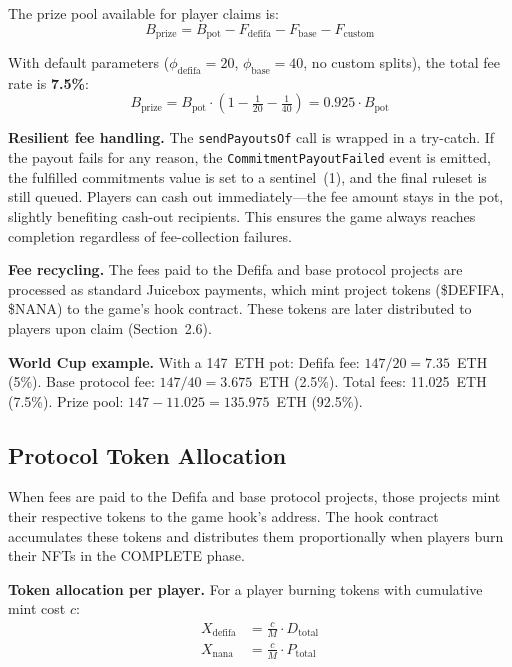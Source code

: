 \documentclass[11pt,a4paper]{article}
\begin{document}
The prize pool available for player claims is:
\begin{equation}
\boxed{B_{\text{prize}} = B_{\text{pot}} - F_{\text{defifa}} - F_{\text{base}} - F_{\text{custom}}}
\end{equation}

With default parameters ($\phi_{\text{defifa}} = 20$, $\phi_{\text{base}} = 40$, no custom splits), the total fee rate is \textbf{7.5\%}:
\begin{equation}
B_{\text{prize}} = B_{\text{pot}} \cdot \left(1 - \tfrac{1}{20} - \tfrac{1}{40}\right) = 0.925 \cdot B_{\text{pot}}
\end{equation}

\textbf{Resilient fee handling.} The \texttt{sendPayoutsOf} call is wrapped in a try-catch. If the payout fails for any reason, the \texttt{CommitmentPayoutFailed} event is emitted, the fulfilled commitments value is set to a sentinel~(1), and the final ruleset is still queued. Players can cash out immediately---the fee amount stays in the pot, slightly benefiting cash-out recipients. This ensures the game always reaches completion regardless of fee-collection failures.

\textbf{Fee recycling.} The fees paid to the Defifa and base protocol projects are processed as standard Juicebox payments, which mint project tokens (\$DEFIFA, \$NANA) to the game's hook contract. These tokens are later distributed to players upon claim (Section~2.6).

\textbf{World Cup example.} With a 147~ETH pot: Defifa fee: $147 / 20 = 7.35$~ETH (5\%). Base protocol fee: $147 / 40 = 3.675$~ETH (2.5\%). Total fees: 11.025~ETH (7.5\%). Prize pool: $147 - 11.025 = 135.975$~ETH (92.5\%).

\subsection{Protocol Token Allocation}

When fees are paid to the Defifa and base protocol projects, those projects mint their respective tokens to the game hook's address. The hook contract accumulates these tokens and distributes them proportionally when players burn their NFTs in the COMPLETE phase.

\textbf{Token allocation per player.} For a player burning tokens with cumulative mint cost $c$:
\begin{align}
X_{\text{defifa}} &= \frac{c}{M} \cdot D_{\text{total}} \\[4pt]
X_{\text{nana}} &= \frac{c}{M} \cdot P_{\text{total}}
\end{align}
\end{document}
